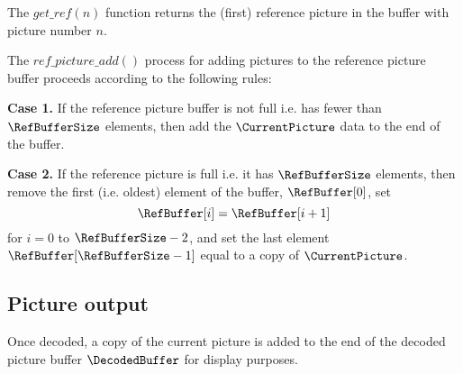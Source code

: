 The $get\_ref(n)$ function returns the (first) reference picture in the buffer with 
picture number $n$.  

The $ref\_picture\_add()$ process for adding pictures to the reference picture
buffer proceeds according to the following rules:

{\bf Case 1.} If the reference picture buffer is not full i.e. has fewer than $\RefBufferSize$ elements,
then add the $\CurrentPicture$ data to the end of the buffer. 

{\bf Case 2.} If the reference picture is full i.e. it has $\RefBufferSize$ elements, then remove the
first (i.e. oldest) element of the buffer, $\RefBuffer[0]$, set
\[\RefBuffer[i] = \RefBuffer[i+1] \]
for $i=0$ to $\RefBufferSize-2$, and set the last element $\RefBuffer[\RefBufferSize-1]$ equal to
a copy of $\CurrentPicture$.
 
\subsection{Picture output}
\label{picoutput}

Once decoded, a copy of the current picture is added to the end of the decoded picture buffer
$\DecodedBuffer$ for display purposes.


